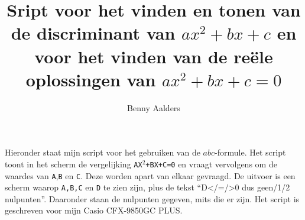 \documentclass[a4paper]{article}
\author{Benny Aalders}
\title{Sript voor het vinden en tonen van de discriminant van $ax^2+bx+c$ en  voor het vinden van de re\"ele oplossingen van $ax^2+bx+c=0$}
\date{}
\begin{document}
\maketitle

\noindent Hieronder staat mijn script voor het gebruiken van de $abc$-formule. Het script toont in het scherm de vergelijking \texttt{AX$^2$+BX+C=0} en vraagt vervolgens om de waardes van \texttt A,\texttt B en \texttt C. Deze worden apart van elkaar gevraagd. De uitvoer is een scherm waarop \texttt {A,B,C} en \texttt D te zien zijn, plus de tekst ``D\textless/=/\textgreater0 dus geen/1/2 nulpunten''. Daaronder staan de nulpunten gegeven, mits die er zijn. Het script is geschreven voor mijn Casio CFX-9850GC PLUS. 


\end{document}
